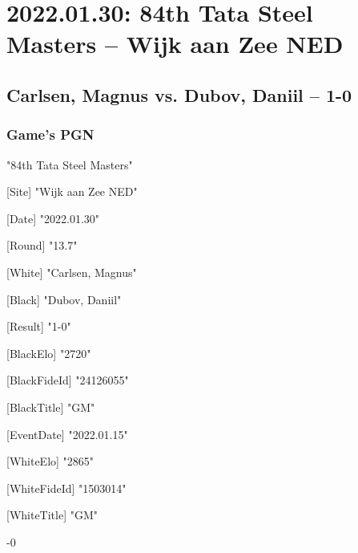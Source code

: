 \documentclass[9pt]{extarticle}
\begin{document}
\section*{2022.01.30: 84th Tata Steel Masters -- Wijk aan Zee NED}

\subsection*{Carlsen, Magnus vs. Dubov, Daniil -- 1-0}
\subsubsection*{Game's PGN}
\begin{flushleft}
[Event] "84th Tata Steel Masters"

[Site] "Wijk aan Zee NED"

[Date] "2022.01.30"

[Round] "13.7"

[White] "Carlsen, Magnus"

[Black] "Dubov, Daniil"

[Result] "1-0"

[BlackElo] "2720"

[BlackFideId] "24126055"

[BlackTitle] "GM"

[EventDate] "2022.01.15"

[WhiteElo] "2865"

[WhiteFideId] "1503014"

[WhiteTitle] "GM"

\end{flushleft}
\begin{flushleft}
 \quad  {}-0
\end{flushleft}
\parindent 0mm
\end{document}
